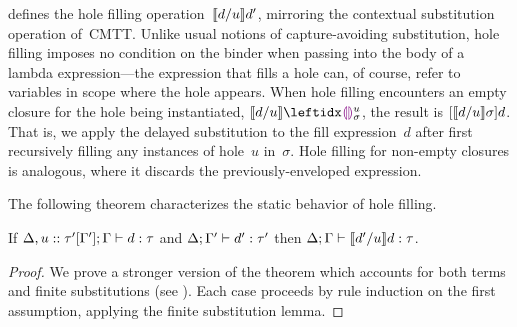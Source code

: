  defines the hole filling operation~$\llbracket d / u\rrbracket d'$,
mirroring the contextual substitution operation of~CMTT.
%
Unlike usual notions of capture-avoiding substitution, 
hole filling imposes no condition on the binder when passing into the
body of a lambda expression---the expression that fills a hole can, of
course, refer to variables in scope where the hole appears.
%
When hole filling encounters an empty closure for the hole being
instantiated, $\instantiate{d}{u}{\dehole{u}{\sigma}{}}$, the result
is $[\llbracket d / u\rrbracket \sigma]d$.
%
That is, we apply the delayed substitution to the fill expression~$d$
after first recursively filling any instances of hole~$u$ in~$\sigma$.
%
Hole filling for non-empty closures is analogous, where it discards
the previously-enveloped expression.
%
%
%



The following theorem characterizes the static behavior of hole filling.
\begin{thm}[Filling]
  If $\Delta, u :: \tau'[\Gamma']; \Gamma \vdash d : \tau$
  and $\Delta; \Gamma' \vdash d' : \tau'$
  then $\Delta; \Gamma \vdash \llbracket d' / u\rrbracket d : \tau$.
\begin{proof}
We prove a stronger version of the theorem which accounts for both
terms and finite substitutions (see \cite{Nanevski2008}).
%
Each case proceeds by rule induction on the first assumption, applying
the finite substitution lemma.
\end{proof}
\end{thm}


